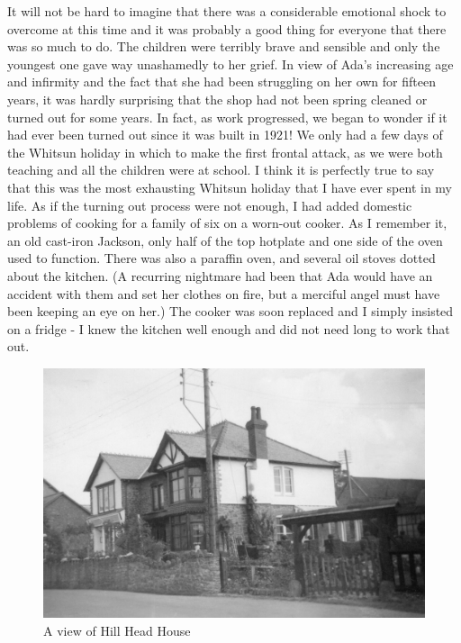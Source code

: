 It will not be hard to imagine that there was a considerable emotional shock to overcome at this time and it was probably a good thing for everyone that there was so much to do. The children were terribly brave and sensible and only the youngest one gave way unashamedly to her grief. In view of Ada's increasing age and infirmity and the fact that she had been struggling on her own for fifteen years, it was hardly surprising that the shop had not been spring cleaned or turned out for some years. In fact, as work progressed, we began to wonder if it had ever been turned out since it was built in 1921! We only had a few days of the Whitsun holiday in which to make the first frontal attack, as we were both teaching and all the children were at school. I think it is perfectly true to say that this was the most exhausting Whitsun holiday that I have ever spent in my life. As if the turning out process were not enough, I had added domestic problems of cooking for a family of six on a worn-out cooker. As I remember it, an old cast-iron Jackson, only half of the top hotplate and one side of the oven used to function. There was also a paraffin oven, and several oil stoves dotted about the kitchen. (A recurring nightmare had been that Ada would have an accident with them and set her clothes on fire, but a merciful angel must have been keeping an eye on her.) The cooker was soon replaced and I simply insisted on a fridge - I knew the kitchen well enough and did not need long to work that out.


\begin{figure}[]
     \includegraphics[width=1\textwidth]{figures/HillHeadHouse1960}
     \caption{A view of Hill Head House}
     \label{fig:HHH1960}
\end{figure}

